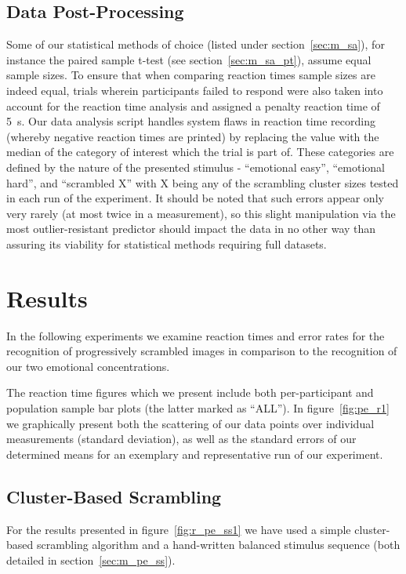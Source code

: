 	\subsection{Data Post-Processing}
	    Some of our statistical methods of choice (listed under section~\ref{sec:m_sa}), for instance the paired sample t-test (see section~\ref{sec:m_sa_pt}), assume equal sample sizes.
	    To ensure that when comparing reaction times sample sizes are indeed equal, trials wherein participants failed to respond were also taken into account for the reaction time analysis and assigned a penalty reaction time of \SI{5}{\second}.
	    Our data analysis script handles system flaws in reaction time recording (whereby negative reaction times are printed) by replacing the value with the median of the category of interest which the trial is part of.
	    These categories are defined by the nature of the presented stimulus - “emotional easy”, “emotional hard”, and “scrambled X” with X being any of the scrambling cluster sizes tested in each run of the experiment.
	    It should be noted that such errors appear only very rarely (at most twice in a measurement), so this slight manipulation via the most outlier-resistant predictor should impact the data in no other way than assuring its viability for statistical methods requiring full datasets.  
    \section{Results}\label{sec:pe_r}
	In the following experiments we examine reaction times and error rates for the recognition of progressively scrambled images in comparison to the recognition of our two emotional concentrations.
	
	The reaction time figures which we present include both per-participant and population sample bar plots (the latter marked as “ALL”).
	In figure~\ref{fig:pe_r1} we graphically present both the scattering of our data points over individual measurements (standard deviation), as well as the standard errors of our determined means for an exemplary and representative run of our experiment. 
	\subsection{Cluster-Based Scrambling}
	    For the results presented in figure~\ref{fig:r_pe_ss1} we have used a simple cluster-based scrambling algorithm and a hand-written balanced stimulus sequence 
	    (both detailed in section~\ref{sec:m_pe_ss}).
	    
